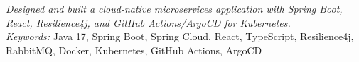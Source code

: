 

\nointent
\textit{Designed and built a cloud-native microservices application with Spring Boot, React, Resilience4j, and GitHub Actions/ArgoCD for Kubernetes.} \\

\nointent
\textit{Keywords:} Java 17, Spring Boot, Spring Cloud, React, TypeScript, Resilience4j, RabbitMQ, Docker, Kubernetes, GitHub Actions, ArgoCD
